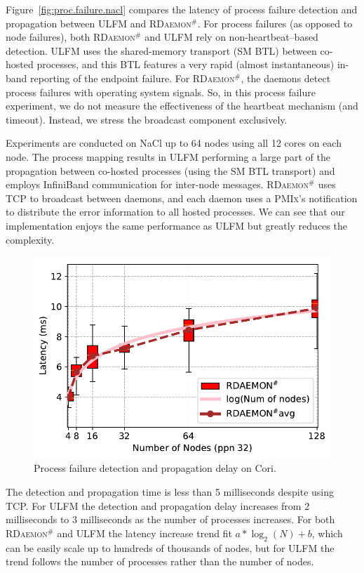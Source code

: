 \documentclass[5p,times,twocolumn]{elsarticle}
\newcommand{\pmix}[0]{\textsc{PMIx}\xspace}
\newcommand{\ulfm}[0]{\textsc{ULFM}\xspace}
\newcommand{\ourwork}[0]{\textsc{RDaemon}\ensuremath{^\#}\xspace}
\begin{document}
Figure~\ref{fig:proc.failure.nacl} compares the latency of process failure detection and propagation between \ulfm and \ourwork. For process failures (as opposed to node failures), both
\ourwork and \ulfm rely on non-heartbeat--based detection.
%
\ulfm uses the
shared-memory transport (SM BTL) between co-hosted processes, and this BTL
features a very rapid (almost instantaneous) in-band reporting of the
endpoint failure. For \ourwork, the daemons detect process failures
with operating system signals.
%
So, in this process failure experiment, we do not measure
the effectiveness of the heartbeat mechanism (and timeout). Instead, we
stress the broadcast component exclusively.

Experiments are conducted on NaCl up to 64 nodes using all 12 cores on each node.
The process mapping results in \ulfm performing a large part of the
propagation between co-hosted processes (using the SM BTL transport)
and employs InfiniBand communication for inter-node messages.
\ourwork uses TCP to broadcast between daemons, and each daemon uses a
\pmix's notification to distribute the error information to all hosted processes.
 We can see that our implementation enjoys the same performance as \ulfm but greatly reduces the complexity.
%
\begin{figure}[h]
  \centering
  \includegraphics[width=\linewidth]{Cori_Process_Failure_fit.pdf}\vspace{-1em}
  \caption{Process failure detection and propagation delay on Cori.}
  \label{fig:proc.failure.cori}
\end{figure}
The detection and propagation time is less than 5 milliseconds despite using TCP. For \ulfm the detection and propagation delay increases from 2 milliseconds to 3 milliseconds as the  number of processes increases. For both \ourwork and \ulfm the latency increase trend fit $ a*\log_2(N) + b $, which can be easily scale up to hundreds of thousands of nodes, but for \ulfm
the trend follows the number of processes rather than the number of nodes.
\end{document}
